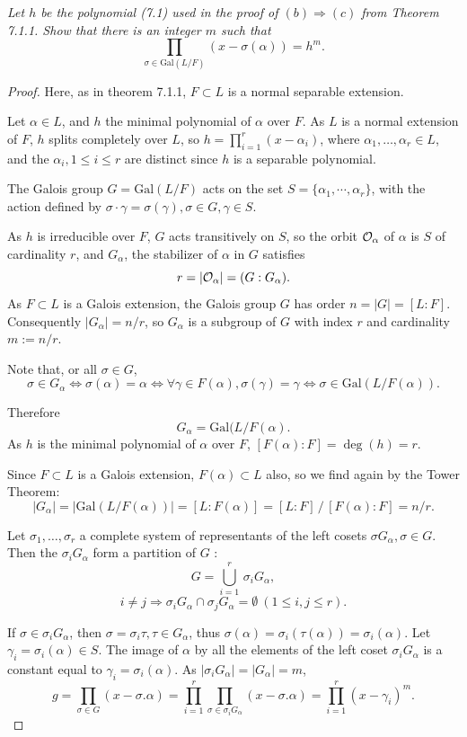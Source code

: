 \documentclass[11pt,a4paper]{article}
\newcommand{\Gal}{\mathrm{Gal}}
\begin{document}
{\it Let $h$ be the polynomial (7.1) used in the proof of $(b) \Rightarrow (c)$ from Theorem 7.1.1. Show that there is an integer $m$ such that
$$\prod_{\sigma \in \Gal(L/F)} (x - \sigma(\alpha)) = h^m.$$
}
\begin{proof}
Here, as in theorem 7.1.1, $F \subset L$ is a normal separable extension. 

Let $\alpha \in L$, and $h$ the minimal polynomial of $\alpha$ over $F$. As $L$ is a normal extension of $F$, $h$ splits completely over $L$, so $h = \prod\limits_{i=1}^r(x-\alpha_i)$, where $\alpha_1,\ldots,\alpha_r\in L$, and the $\alpha_i,1\leq i \leq r$ are distinct since $h$ is a separable polynomial. 

The Galois group $G = \Gal(L/F)$ acts on the set $S = \{\alpha_1,\cdots,\alpha_r\}$, with the action defined by $\sigma \cdot \gamma = \sigma(\gamma), \sigma \in G,\gamma\in S$.

As $h$ is irreducible over $F$, $G$ acts transitively on $S$, so the orbit ${\cal O}_{\alpha}$ of $\alpha$ is $S$ of cardinality $r$, and  $G_\alpha$, the stabilizer of $\alpha$ in $G$ satisfies
$$r = \vert {\cal O}_{\alpha} \vert = (G : G_\alpha).$$
As  $F\subset L$ is a Galois extension, the Galois group $G$ has order $n = \vert G \vert = [L:F]$.
Consequently $\vert G_\alpha \vert = n/r$, so $G_\alpha$ is a subgroup of $G$ with index $r$ and cardinality $m:=n/r$. 

\bigskip

 Note that, or all $\sigma \in G$, 
$$\sigma \in G_\alpha \iff \sigma(\alpha) = \alpha \iff \forall \gamma \in F(\alpha), \sigma(\gamma) = \gamma \iff \sigma \in \Gal(L/F(\alpha)).$$

Therefore
$$G_\alpha = \Gal(L/F(\alpha).$$
As $h$ is the minimal  polynomial of $\alpha$ over $F$, $[F(\alpha) : F] = \deg(h) = r$. 

Since $F \subset L$ is a Galois extension, $F(\alpha) \subset L$ also, so we find again by the Tower Theorem: 
$$\vert G_\alpha \vert  = \vert \Gal(L/F(\alpha))\vert = [L:F(\alpha)] = [L:F]\, / \,[F(\alpha):F] = n/r.$$

\bigskip

Let $\sigma_1,\ldots,\sigma_r$ a complete system of representants of the left cosets $\sigma G_\alpha, \sigma \in G$. Then the $\sigma_i G_\alpha$ form a partition of $G$ : 
$$G = \bigcup_{i=1}^r \,\sigma_i G_\alpha,$$ $$i \neq j \Rightarrow \sigma_i G_\alpha \cap \sigma_j G_\alpha = \emptyset \ (1\leq i,j \leq r).$$

If $\sigma \in \sigma_iG_\alpha$, then $\sigma = \sigma_i \tau, \tau \in G_\alpha$, thus $\sigma(\alpha) =\sigma_i(\tau(\alpha)) = \sigma_i(\alpha)$. Let $\gamma_i =\sigma_i(\alpha)\in S$. The image of $\alpha$ by all the elements of the left coset $\sigma_iG_\alpha$ is a constant  equal to $\gamma_i = \sigma_i(\alpha)$. As $\vert \sigma_iG_\alpha \vert = \vert G_\alpha \vert= m$,
 $$g = \prod_{\sigma \in G} (x - \sigma.\alpha) = \prod_{i=1}^r \prod_{\sigma \in \sigma_i G_\alpha} (x - \sigma.\alpha) = \prod_{i=1}^r (x-\gamma_i)^m.$$


\end{proof}
\end{document}
